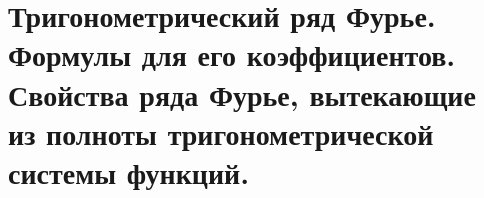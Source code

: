 {
	\section{Тригонометрический ряд Фурье. Формулы для его коэффициентов. Свойства ряда Фурье, вытекающие из
	полноты тригонометрической системы функций.}

	\newpage
}